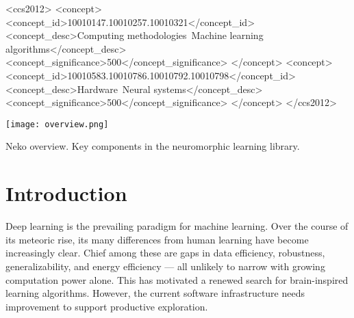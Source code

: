 \documentclass[sigconf,dvipsnames]{acmart}
\begin{document}
\begin{CCSXML}
<ccs2012>
   <concept>
       <concept_id>10010147.10010257.10010321</concept_id>
       <concept_desc>Computing methodologies~Machine learning algorithms</concept_desc>
       <concept_significance>500</concept_significance>
       </concept>
   <concept>
       <concept_id>10010583.10010786.10010792.10010798</concept_id>
       <concept_desc>Hardware~Neural systems</concept_desc>
       <concept_significance>500</concept_significance>
       </concept>
 </ccs2012>
\end{CCSXML}



\begin{teaserfigure}
  \texttt{[image: overview.png]}
  \caption{Neko overview. \textmd{Key components in the neuromorphic learning library.}}
  \label{fig:teaser}
\end{teaserfigure}

\maketitle


\section{Introduction}
Deep learning is the prevailing paradigm for machine learning.
Over the course of its meteoric rise, its many differences from human learning have become increasingly clear.
Chief among these are gaps in data efficiency, robustness, generalizability, and energy efficiency --- all unlikely to narrow with growing computation power alone.
This has motivated a renewed search for brain-inspired learning algorithms.
However, the current software infrastructure needs improvement to support productive exploration.
\end{document}
